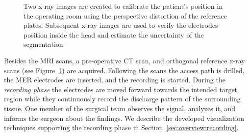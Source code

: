 \documentclass[review]{vgtc}                 %
\begin{document}
\begin{figure}[b]
    \centering
    \hspace*{0.1cm}
    \caption{Two x-ray images are created to calibrate the patient's position in the operating room using the perspective distortion of the reference plates. Subsequent x-ray images are used to verify the electrodes position inside the head and estimate the uncertainty of the segmentation.}
    \label{fig:xrayreferencescans}
\end{figure}

Besides the MRI scans, a pre-operative CT scan, and orthogonal reference x-ray scans  (see Figure~\ref{fig:xrayreferencescans}) are acquired. Following the scans the access path is drilled, the MER electrodes are inserted, and the recording is started. During the \emph{recording phase} the electrodes are moved forward towards the intended target region while they continuously record the discharge pattern of the surrounding tissue. One member of the surgical team observes the signal, analyzes it, and informs the surgeon about the findings. We describe the developed visualization techniques supporting the recording phase in Section~\ref{sec:overview:recording}.
\end{document}
